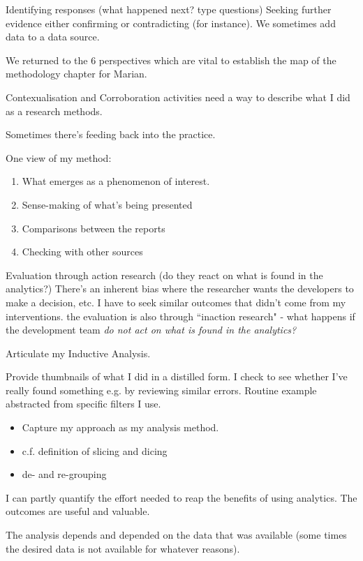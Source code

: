Identifying responses (what happened next? type questions)
Seeking further evidence either confirming or contradicting (for instance). We sometimes add data to a data source. 

We returned to the 6 perspectives which are vital to establish the map of the methodology chapter for Marian.

Contexualisation and Corroboration activities need a way to describe what I did as a research methods.


Sometimes there’s feeding back into the practice. 

One view of my method:
\begin{enumerate}
    \item What emerges as a phenomenon of interest. 
    \item Sense-making of what’s being presented
    \item Comparisons between the reports
    \item Checking with other sources 
\end{enumerate}

Evaluation through action research (do they react on what is found in the analytics?) There’s an inherent bias where the researcher wants the developers to make a decision, etc. I have to seek similar outcomes that didn’t come from my interventions.  the evaluation is also through ``inaction research" - what happens if the development team \emph{do not act on what is found in the analytics?}

Articulate my Inductive Analysis. 

Provide thumbnails of what I did in a distilled form. I check to see whether I’ve really found something e.g. by reviewing similar errors. Routine example abstracted from specific filters I use. 
\begin{itemize}
    \item Capture my approach as my analysis method.
    \item c.f. definition of slicing and dicing
    \item de- and re-grouping 
\end{itemize}

I can partly quantify the effort needed to reap the benefits of using analytics. The outcomes are useful and valuable. 

The analysis depends and depended on the data that was available (some times the desired data is not available for whatever reasons). 

